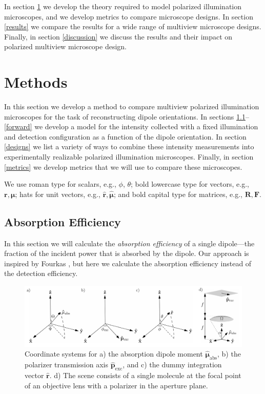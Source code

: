 \documentclass[10pt]{article}
\providecommand{\mb}[1]{\mathbf{#1}}
\providecommand{\mh}[1]{\mathbf{\hat{#1}}}
\providecommand{\bs}[1]{\boldsymbol{#1}}
\begin{document}
In section \ref{methods} we develop the theory required to model polarized
illumination microscopes, and we develop metrics to compare microscope
designs. In section \ref{results} we compare the results for a wide range of
multiview microscope designs. Finally, in section \ref{discussion} we discuss
the results and their impact on polarized multiview microscope design.

\section{Methods}\label{methods}
In this section we develop a method to compare multiview polarized illumination
microscopes for the task of reconstructing dipole orientations. In sections
\ref{excitation}--\ref{forward} we develop a model for the intensity collected
with a fixed illumination and detection configuration as a function of the
dipole orientation. In section \ref{designs} we list a variety of ways to
combine these intensity measurements into experimentally realizable polarized
illumination microscopes. Finally, in section \ref{metrics} we develop metrics
that we will use to compare these microscopes.

We use roman type for scalars, e.g., $\phi$, $\theta$; bold lowercase type for
vectors, e.g., $\mb{r}, \bs{\mu}$; hats for unit vectors, e.g.,
$\mh{r}, \hat{\bs{\mu}}$; and bold capital type for matrices, e.g.,
$\mb{R}, \mb{F}$.

\subsection{Absorption Efficiency}\label{excitation}
In this section we will calculate the \emph{absorption efficiency} of a single
dipole---the fraction of the incident power that is absorbed by the
dipole. Our approach is inspired by Fourkas \cite{fourkas2001}, but here we
calculate the absorption efficiency instead of the detection efficiency.

\begin{figure}[H]
\centering\includegraphics[width=\textwidth]{frames}
\caption{Coordinate systems for a) the absorption dipole moment
  $\hat{\bs{\mu}}_{\text{abs}}$, b) the polarizer transmission axis
   $\hat{\mb{p}}_{\text{exc}}$, and c) the dummy integration vector
  $\hat{\mb{r}}$. d) The scene consists of a single molecule at the focal point
  of an objective lens with a polarizer in the aperture plane.}
\hypertarget{typo}{}
\label{fig:coordinates}
\end{figure}
\end{document}
